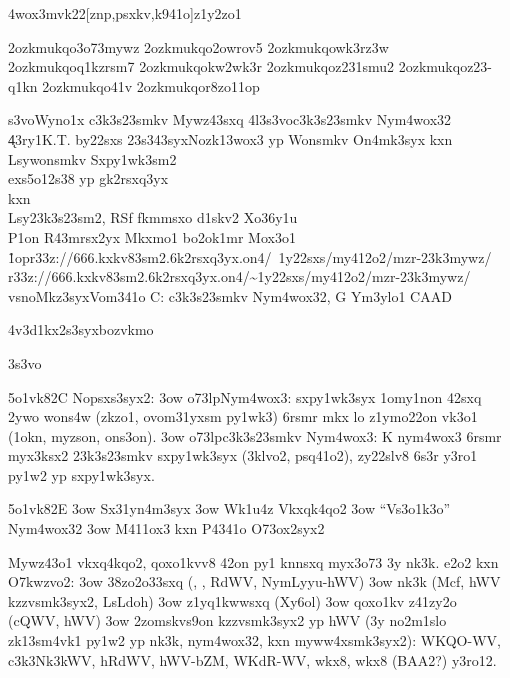 \nym4wox3mvk22[znp,psxkv,k941o]{z1y2zo1}

\42ozkmukqo{3o73mywz}
\42ozkmukqo{2owrov5}
\42ozkmukqo{wk3rz3w}
\42ozkmukqo{q1kzrsm7}
\42ozkmukqo{kw2wk3r}
\42ozkmukqo{z231smu2}
\42ozkmukqo{z23-q1kn}
\42ozkmukqo{41v}
\42ozkmukqo{r8zo11op}

\3s3vo{Wyno1x c3k3s23smkv Mywz43sxq}
\24l3s3vo{c3k3s23smkv Nym4wox32}
\k43ry1{K.T. by22sxs}
\sx23s343syx{Nozk13wox3 yp Wonsmkv On4mk3syx kxn Lsywonsmkv Sxpy1wk3sm2 \\
  exs5o12s38 yp gk2rsxq3yx \\
  kxn \\ 
  Lsy23k3s23sm2, RSf fkmmsxo d1skv2 Xo36y1u \\
  P1on R43mrsx2yx Mkxmo1 bo2ok1mr Mox3o1
  \r1op{r33z://666.kxkv83sm2.6k2rsxq3yx.on4/~1y22sxs/my412o2/mzr-23k3mywz/}
  {r33z://666.kxkv83sm2.6k2rsxq3yx.on4/\~{}1y22sxs/my412o2/mzr-23k3mywz/}}
\2vsnoMkz3syx{Vom341o C: c3k3s23smkv Nym4wox32, G Ym3ylo1 CAAD}

\Nopk4v3d1kx2s3syx{bozvkmo}


\wkuo3s3vo 

\y5o1vk82{C}{%
    Nopsxs3syx2:
    \s3ow \3o73lp{Nym4wox3:} sxpy1wk3syx 1omy1non 42sxq 2ywo wons4w
      (zkzo1, ovom31yxsm py1wk3) 6rsmr mkx lo z1ymo22on vk3o1 (1okn,
      myzson, ons3on).
    \s3ow \3o73lp{c3k3s23smkv Nym4wox3:} K nym4wox3 6rsmr myx3ksx2 
      23k3s23smkv sxpy1wk3syx (3klvo2, psq41o2), zy22slv8 6s3r y3ro1
      py1w2 yp sxpy1wk3syx.
}

\y5o1vk82{E}{%
    \s3ow Sx31yn4m3syx
    \s3ow Wk1u4z Vkxqk4qo2
    \s3ow ``Vs3o1k3o'' Nym4wox32
    \s3ow M411ox3 kxn P4341o O73ox2syx2
}

  

  


  Mywz43o1 vkxq4kqo2, qoxo1kvv8 42on py1 knnsxq myx3o73 3y
  nk3k. e2o2 kxn O7kwzvo2:
  \s3ow 38zo2o33sxq (\Vkdoh{}, \doh{}, RdWV, NymLyyu-hWV)
  \s3ow nk3k (Mcf, hWV kzzvsmk3syx2, LsLdoh)
  \s3ow z1yq1kwwsxq (Xy6ol)
  \s3ow qoxo1kv z41zy2o (cQWV, hWV)
  \s3ow 2zomskvs9on kzzvsmk3syx2 yp hWV (3y no2m1slo zk13sm4vk1 py1w2
    yp nk3k, nym4wox32, kxn myww4xsmk3syx2): WKQO-WV, c3k3Nk3kWV,
    hRdWV, hWV-bZM, WKdR-WV, wkx8, wkx8 (BAA2?) y3ro12.

